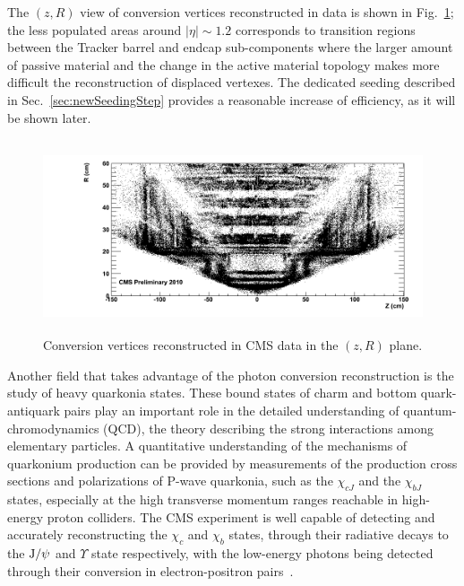 \documentclass[a4paper]{jpconf}
\def \JPsi{\rm J/\psi}
\begin{document}
%
The  $(z, R)$  view of conversion vertices reconstructed in data is  shown in Fig.~\ref{fig:convRZ};  the less populated
areas  around $|\eta|\sim1.2$ corresponds to transition regions between the Tracker
barrel and endcap sub-components where the larger amount of passive material and the change in the active material topology makes more difficult the reconstruction of displaced vertexes. 
The dedicated seeding described in Sec.~\ref{sec:newSeedingStep} provides a reasonable increase of efficiency, as it will be shown later.


\begin{figure}[h!]
  \begin{center}
     \includegraphics[width=17cm,height=5.7cm]{fig/conversions/ptCut/data_rz.png}
      \caption{Conversion vertices reconstructed in CMS data in the $(z,R)$ plane.}
    \label{fig:convRZ}
  \end{center}
\end{figure}



Another field that takes advantage of the photon conversion reconstruction is the study of heavy quarkonia states. These bound states of charm and bottom quark-antiquark pairs play an important role in the detailed understanding of quantum-chromodynamics 
(QCD), the theory describing the strong interactions among elementary particles. 
A quantitative understanding of the mechanisms of quarkonium production can
be provided by measurements of the production cross sections and 
polarizations of P-wave quarkonia, such as the $\chi_{cJ}$ and the 
$\chi_{bJ}$ states, especially at the high transverse momentum ranges
reachable in high-energy proton colliders.
The CMS experiment is well capable 
of detecting and accurately reconstructing the $\chi_{c}$ and $\chi_{b}$
states, through their radiative decays to the $\JPsi$ and $\Upsilon$
state respectively, with the low-energy photons being detected through their conversion 
in electron-positron pairs~\cite{chic}. 
\end{document}
